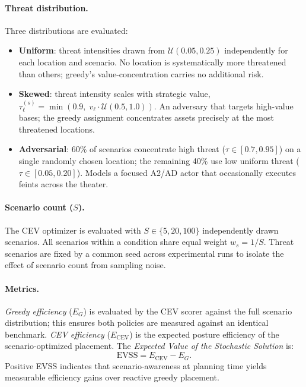 \documentclass[11pt]{article}
\begin{document}
\paragraph{Threat distribution.}
Three distributions are evaluated:
\begin{itemize}
    \item \textbf{Uniform}: threat intensities drawn from
          $\mathcal{U}(0.05, 0.25)$ independently for each location and
          scenario.  No location is systematically more threatened than
          others; greedy's value-concentration carries no additional risk.
    \item \textbf{Skewed}: threat intensity scales with strategic value,
          $\tau_\ell^{(s)} = \min\!\left(0.9,\; v_\ell \cdot
          \mathcal{U}(0.5, 1.0)\right)$.  An adversary that targets
          high-value bases; the greedy assignment concentrates assets
          precisely at the most threatened locations.
    \item \textbf{Adversarial}: 60\% of scenarios concentrate high threat
          ($\tau \in [0.7, 0.95]$) on a single randomly chosen location;
          the remaining 40\% use low uniform threat ($\tau \in [0.05,
          0.20]$).  Models a focused A2/AD actor that occasionally executes
          feints across the theater.
\end{itemize}

\paragraph{Scenario count ($S$).}
The CEV optimizer is evaluated with $S \in \{5, 20, 100\}$ independently
drawn scenarios.  All scenarios within a condition share equal weight
$w_s = 1/S$.  Threat scenarios are fixed by a common seed across
experimental runs to isolate the effect of scenario count from sampling
noise.

\paragraph{Metrics.}
\emph{Greedy efficiency} ($E_G$) is evaluated by the CEV scorer against
the full scenario distribution; this ensures both policies are measured
against an identical benchmark.
\emph{CEV efficiency} ($E_\mathrm{CEV}$) is the expected posture
efficiency of the scenario-optimized placement.
The \emph{Expected Value of the Stochastic Solution} is:
\begin{equation}
    \mathrm{EVSS} = E_\mathrm{CEV} - E_G.
    \label{eq:evss}
\end{equation}
Positive EVSS indicates that scenario-awareness at planning time yields
measurable efficiency gains over reactive greedy placement.
\end{document}
